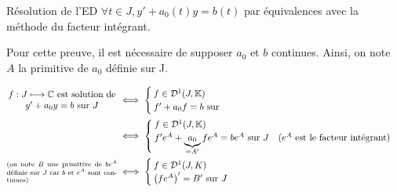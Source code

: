 \documentclass{article}
\renewenvironment{question_kholle}[2][ ]
{
	\subsection{\texorpdfstring{#2}{}}
	\notblank{#1}
	{
		\noindent #1
		\bigbreak
	}
	{}
	\begin{proof}
}
{
	\end{proof}
}
\begin{document}
\begin{question_kholle}{Résolution de l'ED  $\forall t \in J, y' + a_{0}(t)y = b(t)$ par équivalences avec la méthode du facteur intégrant.}

	Pour cette preuve, il est nécessaire de supposer $a_{0}$ et $b$ continues.
	Ainsi, on note $A$ la primitive de $a_{0}$ définie sur J.

	\begin{align*}
		\parbox{12em}{\centering$f:J\longmapsto\C$ est solution de $y'+a_{0}y=b$ sur $J$}                                     & \iff \begin{cases}
			                                                                                                                             f \in \mathcal{D}^1(J,\K) \\
			                                                                                                                             f'+ a_0f = b \text{ sur }
		                                                                                                                             \end{cases}                                                                                                                                             \\
		                                                                                                                      & \iff \begin{cases}
			                                                                                                                             f\in\mathcal{D}^1(J,\K) \\
			                                                                                                                             f' e^{A} + \underbrace{a_{0}}_{=A'}f e^{A} = b e^{A} \text{ sur } J \quad\text{($e^{A}$ est le facteur intégrant)}
		                                                                                                                             \end{cases} \\
		\parbox{12em}{\scriptsize (on note $B$ une primitive de $b e^{A}$ définie sur $J$ car $b$ et $e^{A}$ sont continues)} & \iff \begin{cases}
			                                                                                                                             f\in\mathcal{D}^1(J,K) \\
			                                                                                                                             \left(f e^{A}\right)' = B' \text{ sur } J

\end{cases}
\end{align*}
\end{question_kholle}
\end{document}
